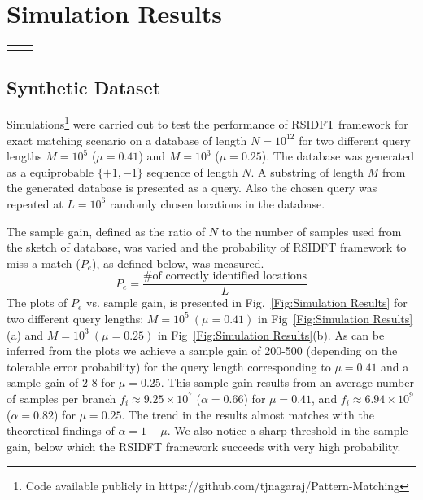 \section{Simulation Results} \label{sec:Simulation_Results}


\begin{figure*}[ht]
		\begin{tabular}{cc}
			\subfloat[$M=10^5(\mu=0.41), \tilde{N}=10^7, ~G=10^{5}$]{\resizebox{0.35\textwidth}{!}{}}&
			\subfloat[$M=10^3(\mu=0.25),~ \tilde{N}=10^6, ~G=10^{6}$]{\resizebox{0.35\textwidth}{!}{}}
		\end{tabular}
		
		\caption{Plots of probability of missing a match vs. sample gain for exact matching of a query of length $M$ from a equiprobable  binary \{+1,-1\} sequence of length $N= 10^{12}$, divided into $G$ blocks each of length $\tilde{N}$. The substring was simulated to repeat in $L=10^6$($\lambda=0.5$) locations uniformly at random.} \label{Fig:Simulation Results}
\end{figure*}

\subsection{Synthetic Dataset}
Simulations\footnote{Code available publicly in https://github.com/tjnagaraj/Pattern-Matching } were carried out to test the performance of RSIDFT framework for exact matching scenario on a database of length $N=10^{12}$ for two different query lengths $M=10^5$ ($\mu = 0.41$) and $M=10^3$ ($\mu = 0.25$). The database was generated as a equiprobable $\{+1,-1\}$ sequence of length $N$. A substring of length $M$ from the generated database is presented as a query. Also the chosen query was repeated at $L=10^6$ randomly chosen locations in the database.

The sample gain, defined as the ratio of $N$ to the number of samples used from the sketch of database, was varied and the probability of RSIDFT framework to miss a match ($P_e$), as defined below, was measured.
\[P_e = \frac{\text{\# of correctly identified locations}}{L} \]   
The plots of $P_e$ vs. sample gain, is presented in Fig.~\ref{Fig:Simulation Results} for two different query lengths: $M=10^5~(\mu=0.41)$ in Fig~\ref{Fig:Simulation Results}(a) and $M=10^3~(\mu=0.25)$ in Fig~\ref{Fig:Simulation Results}(b). As can be inferred from the plots we achieve a sample gain of 200-500 (depending on the tolerable error probability) for the query length corresponding to  $\mu=0.41$ and a sample gain of $2$-$8$ for $\mu=0.25$. This sample gain results from an average number of samples per branch $f_i \approx 9.25 \times10^7 $ ($\alpha=0.66$) for $\mu=0.41$, and  $f_i \approx 6.94\times10^9 $ ($\alpha=0.82$) for $\mu=0.25$. The trend in the results almost matches with the theoretical findings of $\alpha = 1-\mu$. We also notice a sharp threshold in the sample gain, below which the RSIDFT framework succeeds with very high probability. 


